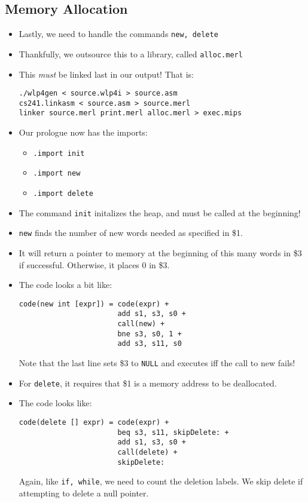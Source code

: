 \documentclass[12pt]{article}
\begin{document}
\begin{itemize}
        \subsection{Memory Allocation}
        \begin{itemize}
            \item Lastly, we need to handle the commands \lstinline[mathescape]{new, delete}
            \item Thankfully, we outsource this to a library, called \lstinline[mathescape]{alloc.merl}
            \item This \emph{must} be linked last in our output!  That is:
\begin{lstlisting}[mathescape, numbers=none, breaklines=true]
./wlp4gen < source.wlp4i > source.asm
cs241.linkasm < source.asm > source.merl
linker source.merl print.merl alloc.merl > exec.mips
\end{lstlisting}
            \item Our prologue now has the imports:
                \begin{itemize}
                    \item \lstinline[mathescape]{.import init}
                    \item \lstinline[mathescape]{.import new}
                    \item \lstinline[mathescape]{.import delete}
                \end{itemize}
            \item The command \lstinline[mathescape]{init} initalizes the heap, and must be called at the beginning!
            \item \lstinline[mathescape]{new} finds the number of new words needed as specified in \$1.
            \item It will return a pointer to memory at the beginning of this many words in \$3 if successful.  Otherwise, it places 0 in \$3.
            \item The code looks a bit like:
\begin{lstlisting}[mathescape, numbers=none, breaklines=true]
code(new int [expr]) = code(expr) +
                       add s1, s3, s0 +
                       call(new) +
                       bne s3, s0, 1 +
                       add s3, s11, s0
\end{lstlisting}
            Note that the last line sets \$3 to \lstinline[mathescape]{NULL} and executes iff the call to new fails!
            \item For \lstinline[mathescape]{delete}, it requires that \$1 is a memory address to be deallocated.
            \item The code looks like:
\begin{lstlisting}[mathescape, numbers=none, breaklines=true]
code(delete [] expr) = code(expr) +
                       beq s3, s11, skipDelete: +
                       add s1, s3, s0 +
                       call(delete) +
                       skipDelete:
\end{lstlisting}
            Again, like \lstinline[mathescape]{if, while}, we need to count the deletion labels.  We skip delete if attempting to delete a null pointer.
    \end{itemize}
\end{itemize}
\end{document}
